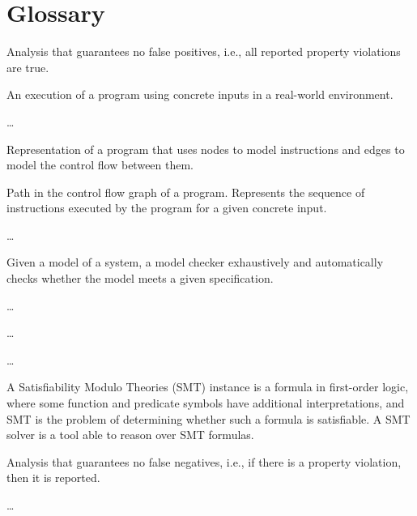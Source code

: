 
\section{Glossary}
\label{se:glossary}

 Analysis that guarantees no false positives, i.e., all reported property violations are true.

\smallskip{} An execution of a program using concrete inputs in a real-world environment.

\smallskip{} \ldots

\smallskip{} Representation of a program that uses nodes to model instructions and edges to model the control flow between them.

\smallskip{} Path in the control flow graph of a program. Represents the sequence of instructions executed by the program for a given concrete input.

\smallskip{} \ldots

\smallskip{} Given a model of a system, a model checker exhaustively and automatically checks whether the model meets a given specification.

\smallskip{} \ldots

\smallskip{} \ldots

\smallskip{} \ldots

\smallskip{} A Satisfiability Modulo Theories (SMT) instance is a formula in first-order logic, where some function and predicate symbols have additional interpretations, and SMT is the problem of determining whether such a formula is satisfiable. A SMT solver is a tool able to reason over SMT formulas.

\smallskip{} Analysis that guarantees no false negatives, i.e., if there is a property violation, then it is reported.

\smallskip{} \ldots